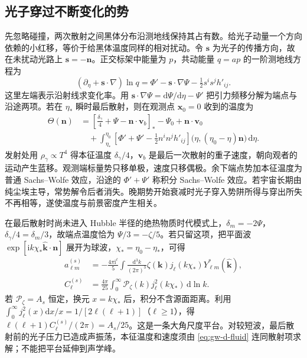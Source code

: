 \subsection{光子穿过不断变化的势}

先忽略碰撞，两次散射之间黑体分布沿测地线保持其占有数。给光子动量一个方向依赖的小红移，等价于给黑体温度同样的相对扰动。令 $\bm s$ 为光子的传播方向，故在未扰动光路上 $\bm s=-\bm n$。正交标架中能量为 $p$，共动能量 $q=ap$ 的一阶测地线方程为
\[
 (\partial_\eta+\bm s\cdot\nabla)\ln q
 =\Phi'-\bm s\cdot\nabla\Psi-\tfrac12 s^is^j h'_{ij}.
\]
这里左端表示沿射线求变化率。用 $\bm s\cdot\nabla\Psi=\mathrm d\Psi/\mathrm d\eta-\Psi'$ 把引力频移分解为端点与沿途两项。若在 $\eta_*$ 瞬时最后散射，则在观测点 $\bm x_0=0$ 收到的温度为
\begin{align}
 \Theta(\bm n)
 &=\left[\frac{\delta_\gamma}{4}+\Psi-\bm n\cdot\bm v_b\right]_{*}
 -\Psi_0+\bm n\cdot\bm v_0 \nonumber\\
 &\quad+\int_{\eta_*}^{\eta_0}\left[\Phi'+\Psi'
      -\tfrac12 n^in^j h'_{ij}\right]
       \big(\eta,(\eta_0-\eta)\bm n\big)\,\mathrm d\eta .\label{eq:gw-d-los}
\end{align}
发射处用 $\rho_\gamma\propto T^4$ 得本征温度 $\delta_\gamma/4$，$\bm v_b$ 是最后一次散射的重子速度，朝向观者的运动产生蓝移。观测端标量势只移单极，速度只移偶极。余下端点势加本征温度为普通 Sachs--Wolfe 效应，沿途的 $\Phi'+\Psi'$ 称积分 Sachs--Wolfe 效应。若宇宙长期由纯尘埃主导，常势解令后者消失。晚期势开始衰减时光子穿入势阱所得与穿出所失不再相等，遂使温度与前景密度产生相关。

在最后散射时尚未进入 Hubble 半径的绝热物质时代模式上，$\delta_m=-2\Psi$，$\delta_\gamma/4=\delta_m/3$，故端点温度恰为 $\Psi/3=-\zeta/5$。若只留这项，把平面波 $\exp[\mathrm i k\chi_* \hat{\bm k}\cdot\bm n]$ 展开为球波，$\chi_*=\eta_0-\eta_*$，可得
\begin{align}
 a_{\ell m}^{(s)}
 &=-\frac{4\pi\mathrm i^\ell}{5}
 \int\frac{\mathrm d^3 k}{(2\pi)^3}
 \zeta(\bm k)j_\ell(k\chi_*)Y_{\ell m}^*(\hat{\bm k}),\nonumber\\
 C_\ell^{(s)}&=\frac{4\pi}{25}\int_0^\infty
 \mathcal P_\zeta(k)j_\ell^2(k\chi_*)\,\mathrm d\ln k.
 \label{eq:gw-d-clsw}
\end{align}
若 $\mathcal P_\zeta=A_s$ 恒定，换元 $x=k\chi_*$ 后，积分不含源面距离。利用 $\int_0^\infty j_\ell^2(x)\mathrm dx/x=1/[2\ell(\ell+1)]$（$\ell\ge1$），得 $\ell(\ell+1)C_\ell^{(s)}/(2\pi)=A_s/25$。这是一条大角尺度平台。对较短波，最后散射前的光子压力已造成声振荡，本征温度和速度须由 \eqref{eq:gw-d-fluid} 连同散射项求解；不能把平台延伸到声学峰。

